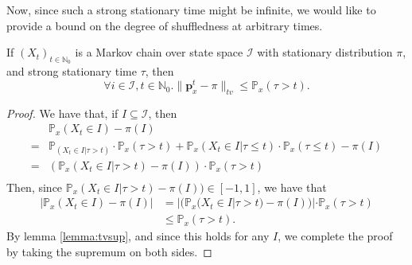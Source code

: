 		Now, since such a strong stationary time might be infinite, we would like to 
		provide a bound on the degree of shuffledness at arbitrary times.
		\begin{lemma}
			If $(X_t)_{t\in\mathbb{N}_0}$ is a Markov chain over state space $\mathcal
			{I}$ with stationary 
			distribution $\pi$, and strong stationary time $\tau$, then 
			$$
				\forall i \in \mathcal{I}, t\in\mathbb{N}_0.
				\|\mathbf{p}_x^t-\pi\|_{tv} \leq \mathbb{P}_x(\tau > t).
			$$
		\end{lemma}
		\begin{proof}
			We have that, if $I \subseteq \mathcal{I}$, then
			\begin{align*}
				&\mathbb{P}_x(X_t \in I) - \pi(I) \\
				=& \mathbb{P}_(X_t \in I | \tau > t)\cdot\mathbb{P}_x(\tau > t) 
				+\mathbb{P}_x(X_t \in I |\tau \leq t)\cdot\mathbb{P}_x(\tau \leq t)
				-\pi(I) \\
				=&(\mathbb{P}_x(X_t\in I|\tau>t)-\pi(I))\cdot\mathbb{P}_x(\tau>t)\\
			\end{align*}
			Then, since $\mathbb{P}_x(X_t\in I|\tau>t)-\pi(I))\in[-1,1]$, we have that
			\begin{align*}
				|\mathbb{P}_x(X_t \in I) - \pi(I)| &=  
				|(\mathbb{P}_x(X_t\in I|\tau>t)-\pi(I))|\cdot\mathbb{P}_x(\tau>t)\\
				&\leq \mathbb{P}_x(\tau>t).
			\end{align*}
			By lemma \ref{lemma:tvsup}, and since this holds for any $I$, we complete 
			the proof by taking the supremum on both sides.
		\end{proof}



